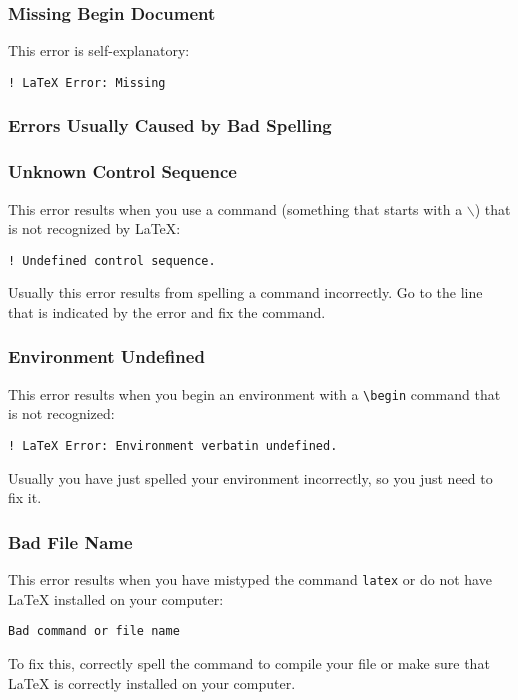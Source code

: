 \subsubsection{Missing Begin Document}
\label{sec:miss-begin-docum}

This error is self-explanatory:
\begin{verbatim}
! LaTeX Error: Missing 
\end{verbatim}

\subsubsection{Errors Usually Caused by Bad Spelling}
\label{sec:errors-usually-caus}

\subsubsection{Unknown Control Sequence}
\label{sec:unkn-contr-sequ}

This error results when you use a command (something that starts with a
\texttt{$\backslash$}) that is not recognized by \LaTeX{}:
\begin{verbatim}
! Undefined control sequence.
\end{verbatim}

Usually this error results from spelling a command incorrectly.  Go to
the line that is indicated by the error and fix the command.

\subsubsection{Environment Undefined}
\label{sec:envir-undef}

This error results when you begin an environment with a \verb|\begin|
command that is not recognized:
\begin{verbatim}
! LaTeX Error: Environment verbatin undefined.
\end{verbatim}

Usually you have just spelled your environment incorrectly, so you
just need to fix it.

\subsubsection{Bad File Name}
\label{sec:bad-file-name}

This error results when you have mistyped the command \texttt{latex}
or do not have \LaTeX{} installed on your computer:
\begin{verbatim}
Bad command or file name
\end{verbatim}
To fix this, correctly spell the command to compile your file or make
sure that \LaTeX{} is correctly installed on your computer.

